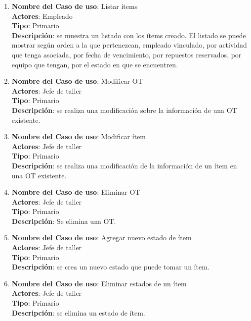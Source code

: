 \documentclass[12pt]{extarticle}
\begin{document}
\begin{spacing}{1.2}
\begin{enumerate}
            \item 	\textbf{Nombre del Caso de uso}: Listar ítems\\
                    \textbf{Actores}: Empleado\\
                    \textbf{Tipo}: Primario\\
                    \textbf{Descripción}: se muestra un listado con los ítems creado. El listado se puede mostrar según orden a la que pertenezcan, empleado vinculado, por actividad que tenga asociada, por fecha de vencimiento, por repuestos reservados, por equipo que tengan, por el estado en que se encuentren.

            \item 	\textbf{Nombre del Caso de uso}: Modificar OT\\
                    \textbf{Actores}: Jefe de taller\\
                    \textbf{Tipo}: Primario\\
                    \textbf{Descripción}: se realiza una modificación sobre la información de una OT existente.

            \item 	\textbf{Nombre del Caso de uso}: Modificar ítem\\
                    \textbf{Actores}: Jefe de taller\\
                    \textbf{Tipo}: Primario\\
                    \textbf{Descripción}: se realiza una modificación de la información de un ítem en una OT existente. 

            \item 	\textbf{Nombre del Caso de uso}: Eliminar OT\\
                    \textbf{Actores}: Jefe de taller\\
                    \textbf{Tipo}: Primario\\
                    \textbf{Descripción}: Se elimina una OT.

            \item 	\textbf{Nombre del Caso de uso}: Agregar nuevo estado de ítem\\
                    \textbf{Actores}: Jefe de taller\\
                    \textbf{Tipo}: Primario\\
                    \textbf{Descripción}: se crea un nuevo estado que puede tomar un ítem.

            \item 	\textbf{Nombre del Caso de uso}: Eliminar estados de un ítem\\
                    \textbf{Actores}: Jefe de taller\\
                    \textbf{Tipo}: Primario\\
                    \textbf{Descripción}: se elimina un estado de ítem.
            

\end{enumerate}
\end{spacing}
\end{document}

